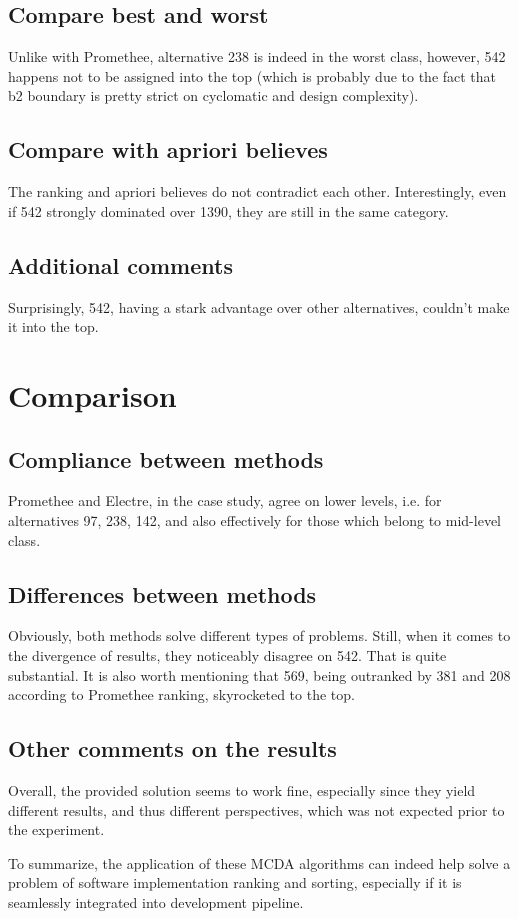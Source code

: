 \documentclass{article}
\begin{document}
\subsection{Compare best and worst}

Unlike with Promethee, alternative 238 is indeed in the worst class, however, 542 happens not to be assigned into the top (which is probably due to the fact that b2 boundary is pretty strict on cyclomatic and design complexity).

\subsection{Compare with apriori believes}

The ranking and apriori believes do not contradict each other. Interestingly, even if 542 strongly dominated over 1390, they are still in the same category.

\subsection{Additional comments}

Surprisingly, 542, having a stark advantage over other alternatives, couldn't make it into the top.

\section{Comparison}
\subsection{Compliance between methods}
Promethee and Electre, in the case study, agree on lower levels, i.e. for alternatives 97, 238, 142, and also effectively for those which belong to mid-level class.

\subsection{Differences between methods}


Obviously, both methods solve different types of problems. Still, when it comes to the divergence of results, they noticeably disagree on 542. That is quite substantial. It is also worth mentioning that 569, being outranked by 381 and 208 according to Promethee ranking, skyrocketed to the top.

\subsection{Other comments on the results}

Overall, the provided solution seems to work fine, especially since they yield different results, and thus different perspectives, which was not expected prior to the experiment.

To summarize, the application of these MCDA algorithms can indeed help solve a problem of software implementation ranking and sorting, especially if it is seamlessly integrated into development pipeline.
\end{document}
